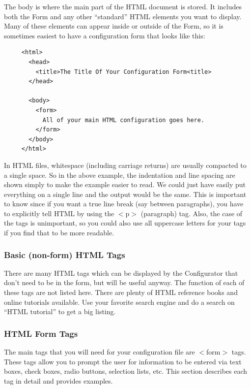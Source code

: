 The body is where the main part of the HTML document is stored. It
includes both the Form and any other {}``standard'' HTML elements
you want to display. Many of these elements can appear inside or outside
of the Form, so it is sometimes easiest to have a configuration form
that looks like this:

\begin{footnotesize}
\begin{verbatim}
     <html>
       <head>
         <title>The Title Of Your Configuration Form<title>
       </head>

       <body> 
         <form> 
           All of your main HTML configuration goes here.
         </form> 
       </body> 
     </html>
\end{verbatim}
\end{footnotesize}

In HTML files, whitespace (including carriage returns) are usually
compacted to a single space. So in the above example, the indentation
and line spacing are shown simply to make the example easier to read.
We could just have easily put everything on a single line and the
output would be the same. This is important to know since if you want
a true line break (say between paragraphs), you have to explicitly
tell HTML by using the $<$p$>$ (paragraph) tag. Also, the case of the
tags is unimportant, so you could also use all uppercase letters for
your tags if you find that to be more readable.


\subsubsection*{Basic (non-form) HTML Tags}

There are many HTML tags which can be displayed by the Configurator
that don't need to be in the form, but will be useful anyway. The
function of each of these tags are not listed here. There are plenty
of HTML reference books and online tutorials available. Use your favorite
search engine and do a search on {}``HTML tutorial'' to get a big
listing.


\subsubsection*{HTML Form Tags}

The main tags that you will need for your configuration file are $<$form$>$
tags. These tags allow you to prompt the user for information to be
entered via text boxes, check boxes, radio buttons, selection lists,
etc. This section describes each tag in detail and provides examples.

